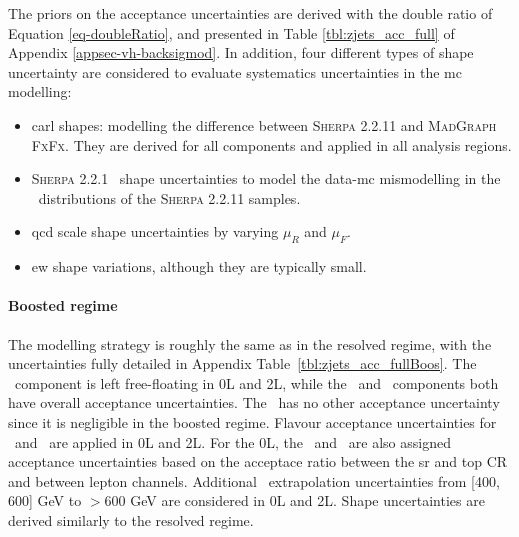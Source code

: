 The priors on the acceptance uncertainties are derived with the double ratio of Equation \ref{eq-doubleRatio}, and presented in Table \ref{tbl:zjets_acc_full} of Appendix \ref{appsec-vh-backsigmod}. In addition, four different types of shape uncertainty are considered to evaluate systematics uncertainties in the \gls{mc} modelling:
\begin{itemize}
    \item \gls{carl} shapes: modelling the difference between \textsc{Sherpa} 2.2.11 and \textsc{MadGraph FxFx}. They are derived for all components and applied in all analysis regions.
    \item \textsc{Sherpa} 2.2.1 \ptv\ shape uncertainties to model the data-\gls{mc} mismodelling in the \ptv\ distributions of the \textsc{Sherpa} 2.2.11 samples. 
    \item \gls{qcd} scale shape uncertainties by varying $\mu_R$ and $\mu_F$.
    \item \gls{ew} shape variations, although they are typically small.
\end{itemize} 

\paragraph{Boosted regime} The modelling strategy is roughly the same as in the resolved regime, with the uncertainties fully detailed in Appendix Table~\ref{tbl:zjets_acc_fullBoos}. The \zhf\ component is left free-floating in 0L and 2L, while the \zmf\ and \zlf\ components both have overall acceptance uncertainties. The \zlf\ has no other acceptance uncertainty since it is negligible in the boosted regime. Flavour acceptance uncertainties for \zhf\ and \zmf\ are applied in 0L and 2L. For the 0L, the \zhf\ and \zmf\ are also assigned acceptance uncertainties based on the acceptace ratio between the \gls{sr} and top CR and between lepton channels. Additional \ptv\ extrapolation uncertainties from [400, 600] GeV to $> 600$ GeV are considered in 0L and 2L. Shape uncertainties are derived similarly to the resolved regime. 

